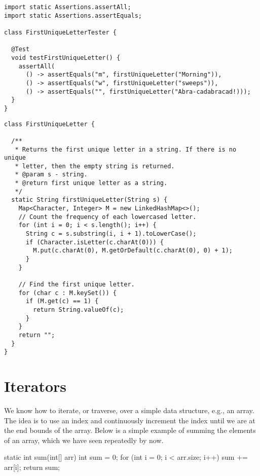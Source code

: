 \begin{cl}[]{}
\begin{lstlisting}[language=MyJava]
import static Assertions.assertAll;
import static Assertions.assertEquals;

class FirstUniqueLetterTester {

  @Test
  void testFirstUniqueLetter() {
    assertAll(
      () -> assertEquals("m", firstUniqueLetter("Morning")),
      () -> assertEquals("w", firstUniqueLetter("sweeps")),
      () -> assertEquals("", firstUniqueLetter("Abra-cadabracad!)));
  }
}
\end{lstlisting}
\end{cl}

\begin{cl}[]{}
\begin{lstlisting}[language=MyJava]
class FirstUniqueLetter {

  /**
   * Returns the first unique letter in a string. If there is no unique
   * letter, then the empty string is returned.
   * @param s - string.
   * @return first unique letter as a string.
   */
  static String firstUniqueLetter(String s) {
    Map<Character, Integer> M = new LinkedHashMap<>();
    // Count the frequency of each lowercased letter.
    for (int i = 0; i < s.length(); i++) {
      String c = s.substring(i, i + 1).toLowerCase();
      if (Character.isLetter(c.charAt(0))) {
        M.put(c.charAt(0), M.getOrDefault(c.charAt(0), 0) + 1);
      }
    }

    // Find the first unique letter.
    for (char c : M.keySet()) {
      if (M.get(c) == 1) {
        return String.valueOf(c);
      }
    }
    return "";
  }
}
\end{lstlisting}
\end{cl}

\section*{Iterators}
We know how to iterate, or traverse, over a simple data structure, e.g., an array. The idea is to use an index and continuously increment the index until we are at the end bounds of the array. Below is a simple example of summing the elements of an array, which we have seen repeatedly by now.

\begin{verbnobox}[\small]
static int sum(int[] arr) {
  int sum = 0;
  for (int i = 0; i < arr.size; i++) { sum += arr[i]; }
  return sum;
}
\end{verbnobox}


